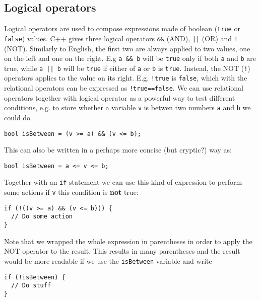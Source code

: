 \documentclass[11pt]{article}
\begin{document}
\subsection{Logical operators}
\label{sec:org286fbb6}
Logical  operators are used to compose expressions made of boolean (\texttt{true} or \texttt{false}) values. C++ gives three logical operators \texttt{\&\&} (AND), \texttt{||} (OR) and \texttt{!} (NOT). Similarly to English, the first two are always applied to two values, one on the left and one on the right. E.g \texttt{a \&\& b} will be \texttt{true} only if both \texttt{a} and \texttt{b} are true, while \texttt{a || b} will be \texttt{true} if either of \texttt{a} or \texttt{b} is \texttt{true}. Instead, the NOT (\texttt{!}) operators applies to the value on its right. E.g. \texttt{!true} is \texttt{false}, which with the relational operators can be expressed as \texttt{!true==false}. We can use relational operators together with logical operator as a powerful way to test different conditions, e.g. to store whether a variable \texttt{v} is betwen two numbers \texttt{a} and \texttt{b} we could do
\begin{verbatim}
bool isBetween = (v >= a) && (v <= b);
\end{verbatim}
This can also be written in a perhaps more concise (but cryptic?) way as:
\begin{verbatim}
bool isBetween = a <= v <= b;
\end{verbatim}
Together with an \texttt{if} statement we can use this kind of expression to perform some actions if \texttt{v} this condition is \textbf{not} true:
\begin{verbatim}
if (!((v >= a) && (v <= b))) {
  // Do some action
}
\end{verbatim}
Note that we wrapped the whole expression in parentheses in order to apply the NOT operator to the result. This results in many parentheses and the result would be more readable if we use the \texttt{isBetween} variable and write
\begin{verbatim}
if (!isBetween) {
  // Do stuff
}
\end{verbatim}
\end{document}
